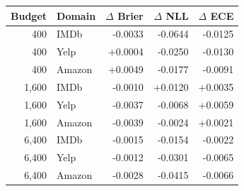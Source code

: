 \begin{tabular}{rlrrr}\toprule
Budget & Domain & $\Delta$ Brier & $\Delta$ NLL & $\Delta$ ECE\\\midrule
400 & IMDb & -0.0033 & -0.0644 & -0.0125\\
400 & Yelp & +0.0004 & -0.0250 & -0.0130\\
400 & Amazon & +0.0049 & -0.0177 & -0.0091\\
1,600 & IMDb & -0.0010 & +0.0120 & +0.0035\\
1,600 & Yelp & -0.0037 & -0.0068 & +0.0059\\
1,600 & Amazon & -0.0039 & -0.0024 & +0.0021\\
6,400 & IMDb & -0.0015 & -0.0154 & -0.0022\\
6,400 & Yelp & -0.0012 & -0.0301 & -0.0065\\
6,400 & Amazon & -0.0028 & -0.0415 & -0.0066\\
\bottomrule\end{tabular}
